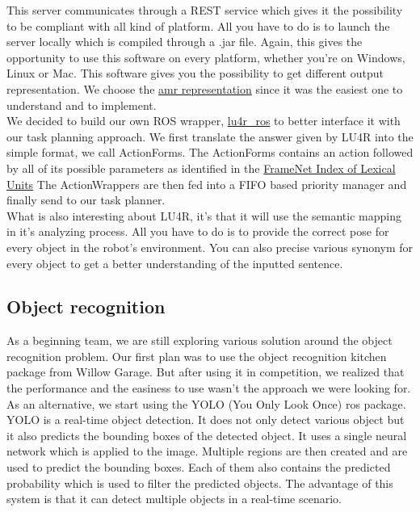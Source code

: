 \documentclass[runningheads,a4paper]{llncs}
\begin{document}
This server communicates through a REST service which gives it the possibility to be compliant with all kind of platform. All you have to do is to launch the server locally which is compiled through a .jar file. Again, this gives the opportunity to use this software on every platform, whether you’re on Windows, Linux or Mac. This software gives you the possibility to get different output representation. We choose the \href{https://github.com/amrisi/amr-guidelines/blob/master/amr.md}{amr representation} since it was the easiest one to understand and to implement.\\

We decided to build our own ROS wrapper, \href{https://github.com/WalkingMachine/lu4r_ros}{lu4r\_ros}  to better interface it with our task planning approach. We first translate the answer given by LU4R into the simple format, we call ActionForms. The ActionForms contains an action followed by all of its possible parameters as identified in the \href{https://framenet2.icsi.berkeley.edu/fnReports/data/luIndex.xml}{FrameNet Index of Lexical Units}
The ActionWrappers are then fed into a FIFO based priority manager and finally send to our task planner.\\

What is also interesting about LU4R, it’s that it will use the semantic mapping in it’s analyzing process. All you have to do is to provide the correct pose for every object in the robot’s environment. You can also precise various synonym for every object to get a better understanding of the inputted sentence.\\


\subsection{Object recognition}
\tab As a beginning team, we are still exploring various solution around the object recognition problem. Our first plan was to use the object recognition kitchen package from Willow Garage. But after using it in competition, we realized that the performance and the easiness to use wasn’t the approach we were looking for. As an alternative, we start using the YOLO\cite{yolo} (You Only Look Once) ros package. \\

YOLO is a real-time object detection. It does not only detect various object but it also predicts the bounding boxes of the detected object. It uses a single neural network which is applied to the image. Multiple regions are then created and are used to predict the bounding boxes. Each of them also contains the predicted probability which is used to filter the predicted objects. The advantage of this system is that it can detect multiple objects in a real-time scenario.\\
 
\end{document}
